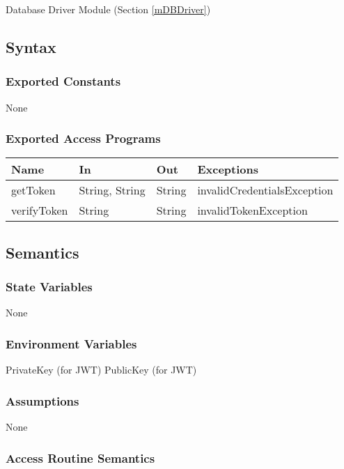 \documentclass[12pt, titlepage]{article}
\begin{document}
 Database Driver Module (Section \ref{mDBDriver}) 

\subsection{Syntax}

\subsubsection{Exported Constants}
None

\subsubsection{Exported Access Programs}

\begin{center}
\begin{tabular}{p{5cm} p{3cm} p{3cm} p{5cm}}
\hline
\textbf{Name} & \textbf{In} & \textbf{Out} & \textbf{Exceptions} \\
\hline
getToken & String, String & String & invalidCredentialsException \\
verifyToken & String & String & invalidTokenException \\
\hline
\end{tabular}
\end{center}

\subsection{Semantics}

\subsubsection{State Variables}
None

\subsubsection{Environment Variables}
PrivateKey (for JWT)
PublicKey (for JWT)

\subsubsection{Assumptions}
None

\subsubsection{Access Routine Semantics}
\end{document}
